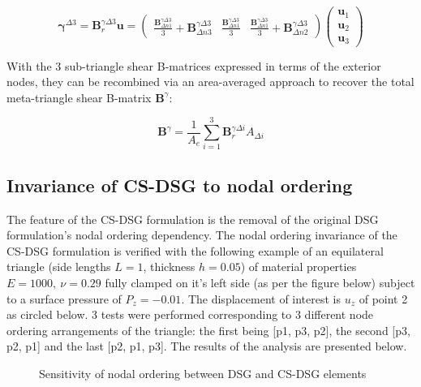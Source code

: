   \begin{equation} 
\boldsymbol{\gamma}^{\Delta 3} =
\mathbf{B}_r^{\gamma\Delta 3}
\mathbf{u}
=
\begin{pmatrix}
\frac{\mathbf{B}_{\Delta n1}^{\gamma\Delta 3}}{3} + \mathbf{B}_{\Delta n3}^{\gamma\Delta 3} &
\frac{\mathbf{B}_{\Delta n1}^{\gamma\Delta 3}}{3} &
\frac{\mathbf{B}_{\Delta n1}^{\gamma\Delta 3}}{3} + \mathbf{B}_{\Delta n2}^{\gamma\Delta 3}
\end{pmatrix}
\begin{pmatrix}
\mathbf{u}_1 \\
\mathbf{u}_2 \\
\mathbf{u}_3
\end{pmatrix}
\label{eqCSDSG10}
\end{equation}

With the 3 sub-triangle shear B-matrices expressed in terms of the exterior nodes, they can be recombined via an area-averaged approach to recover the total meta-triangle shear B-matrix $\mathbf{B}^{\gamma}$:

\begin{equation} 
\mathbf{B}^{\gamma}
=
\frac{1}{A_e}
\sum_{i=1}^3
\mathbf{B}_r^{\gamma\Delta i}
A_{\Delta i}
\label{eqCSDSG11}
\end{equation}

\subsection{Invariance of CS-DSG to nodal ordering}
The feature of the CS-DSG formulation is the removal of the original DSG formulation's nodal ordering dependency. The nodal ordering invariance of the CS-DSG formulation is verified with the following example of an equilateral triangle (side lengths $L = 1$, thickness $h = 0.05$) of material properties $E = 1000,\ \nu = 0.29$ fully clamped on it's left side (as per the figure below) subject to a surface pressure of $P_z = -0.01$. The displacement of interest is $u_z$ of point 2 as circled below. 3 tests were performed corresponding to 3 different node ordering arrangements of the triangle: the first being [p1, p3, p2], the second [p3, p2, p1] and the last [p2, p1, p3]. The results of the analysis are presented below.

\begin{figure}[H]
	\caption{\label{csdsg_nodal_ordering}Sensitivity of nodal ordering between DSG and CS-DSG elements}
\end{figure}

